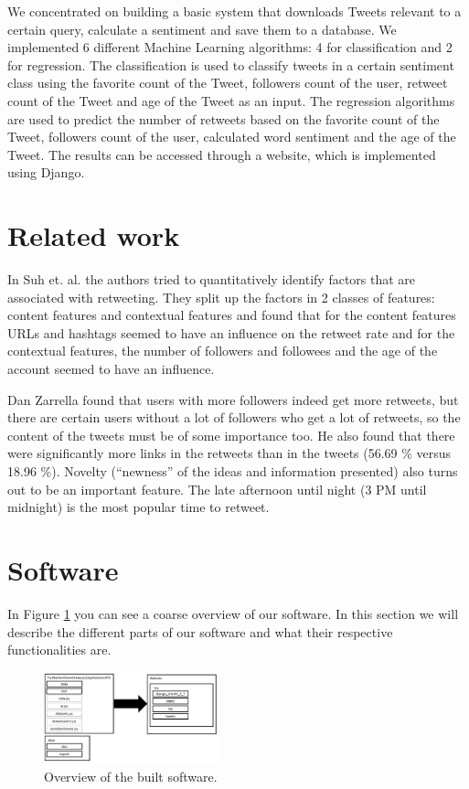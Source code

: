 \documentclass[10pt]{IEEEtran}
\begin{document}
We concentrated on building a basic system that downloads Tweets relevant to a certain query, calculate a sentiment and save them to a database. We implemented 6 different Machine Learning algorithms: 4 for classification and 2 for regression. The classification is used to classify tweets in a certain sentiment class using the favorite count of the Tweet, followers count of the user, retweet count of the Tweet and age of the Tweet as an input. The regression algorithms are used to predict the number of retweets based on the favorite count of the Tweet, followers count of the user, calculated word sentiment and the age of the Tweet. The results can be accessed through a website, which is implemented using Django.

\section{Related work}

In Suh et. al. \cite{want_to_be_retweeted} the authors tried to quantitatively identify factors that are associated with retweeting. They split up the factors in 2 classes of features: content features and contextual features and found that for the content features URLs and hashtags seemed to have an influence on the retweet rate and for the contextual features, the number of followers and followees and the age of the account seemed to have an influence. 

Dan Zarrella \cite{science_of_retweets} found that users with more followers indeed get more retweets, but there are certain users without a lot of followers who get a lot of retweets, so the content of the tweets must be of some importance too. He also found that there were significantly more links in the retweets than in the tweets (56.69 \% versus 18.96 \%). Novelty (``newness'' of the ideas and information presented) also turns out to be an important feature. The late afternoon until night (3 PM until midnight) is the most popular time to retweet. 

\section{Software}

In Figure \ref{software1} you can see a coarse overview of our software. In this section we will describe the different parts of our software and what their respective functionalities are.

\begin{figure}[h!]
\begin{center}
	\includegraphics[width=0.45\textwidth]{images/software}
\caption{Overview of the built software. \label{software1}}
\end{center}
\end{figure}
\end{document}
